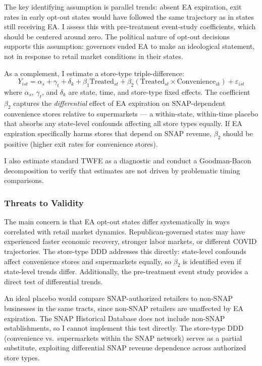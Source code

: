 \documentclass[12pt]{article}
\begin{document}
The key identifying assumption is parallel trends: absent EA expiration, exit rates in early opt-out states would have followed the same trajectory as in states still receiving EA. I assess this with pre-treatment event-study coefficients, which should be centered around zero. The political nature of opt-out decisions supports this assumption: governors ended EA to make an ideological statement, not in response to retail market conditions in their states.

As a complement, I estimate a store-type triple-difference:
\begin{equation}
Y_{ist} = \alpha_s + \gamma_t + \delta_k + \beta_1 \text{Treated}_{st} + \beta_2 (\text{Treated}_{st} \times \text{Convenience}_{ik}) + \varepsilon_{ist}
\end{equation}
where $\alpha_s$, $\gamma_t$, and $\delta_k$ are state, time, and store-type fixed effects. The coefficient $\beta_2$ captures the \textit{differential} effect of EA expiration on SNAP-dependent convenience stores relative to supermarkets --- a within-state, within-time placebo that absorbs any state-level confounds affecting all store types equally. If EA expiration specifically harms stores that depend on SNAP revenue, $\beta_2$ should be positive (higher exit rates for convenience stores).

I also estimate standard TWFE as a diagnostic and conduct a Goodman-Bacon decomposition \citep{goodman2021difference} to verify that estimates are not driven by problematic timing comparisons.

\subsubsection*{Threats to Validity} The main concern is that EA opt-out states differ systematically in ways correlated with retail market dynamics. Republican-governed states may have experienced faster economic recovery, stronger labor markets, or different COVID trajectories. The store-type DDD addresses this directly: state-level confounds affect convenience stores and supermarkets equally, so $\beta_2$ is identified even if state-level trends differ. Additionally, the pre-treatment event study provides a direct test of differential trends.

An ideal placebo would compare SNAP-authorized retailers to non-SNAP businesses in the same tracts, since non-SNAP retailers are unaffected by EA expiration. The SNAP Historical Database does not include non-SNAP establishments, so I cannot implement this test directly. The store-type DDD (convenience vs.\ supermarkets within the SNAP network) serves as a partial substitute, exploiting differential SNAP revenue dependence across authorized store types.
\end{document}
